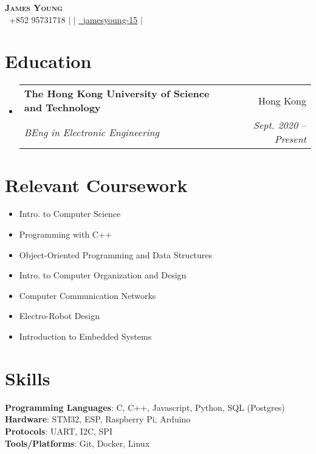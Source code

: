 \documentclass[letterpaper,12pt]{article}
\makeatletter
\newcommand{\resumeSubheading}[4]{
  \vspace{-2pt}\item
    \begin{tabular*}{0.97\textwidth}[t]{l@{\extracolsep{\fill}}r}
      \textbf{#1} & #2 \\
      \textit{\small#3} & \textit{\small #4} \\
    \end{tabular*}\vspace{-7pt}
}
\newcommand{\resumeSubHeadingListStart}{\begin{itemize}[leftmargin=0.05in, label={}]}
\newcommand{\resumeSubHeadingListEnd}{\end{itemize}}
\makeatother
\begin{document}
\begin{center}
    \textbf{\Huge \scshape James Young} \\ \vspace{2pt}
    \small  \faPhone\ {+852 95731718} $|$ 
    \href{mailto:jyyoungaa@connect.ust.hk}{} $|$ 
    \href{https://github.com/jamesyoung-15} {\faGithub\ {jamesyoung-15}} $|$
    \href{https://linkedin.com/in/jamesyyoung}{}
\end{center}

\vspace{-5pt}

\section{Education}
  \resumeSubHeadingListStart
    \resumeSubheading
      {The Hong Kong University of Science and Technology}{Hong Kong}
      {BEng in Electronic Engineering}{Sept. 2020 -- Present}
  \resumeSubHeadingListEnd

\section{Relevant Coursework}
\vspace{-12pt}
    \begin{multicols}{2}
        \begin{itemize}[itemsep=-1pt, parsep=3pt]
        \small
            \item Intro. to Computer Science
            \item Programming with C++
            \item Object-Oriented Programming and Data Structures
            \item Intro. to Computer Organization and Design
            \item Computer Communication Networks
            \item Electro-Robot Design
            \item Introduction to Embedded Systems
        \end{itemize}
    \end{multicols}

\vspace{-20pt}
\section{Skills}
 \begin{itemize}[leftmargin=0.15in, label={}]
    \small{\item{
     \textbf{Programming Languages}{: C, C++, Javascript, Python, SQL (Postgres)} \\
     \textbf{Hardware}{: STM32, ESP, Raspberry Pi, Arduino} \\
     \textbf{Protocols}{: UART, I2C, SPI} \\
     \textbf{Tools/Platforms}{: Git, Docker, Linux} \\
    }}
 \end{itemize}
\end{document}
